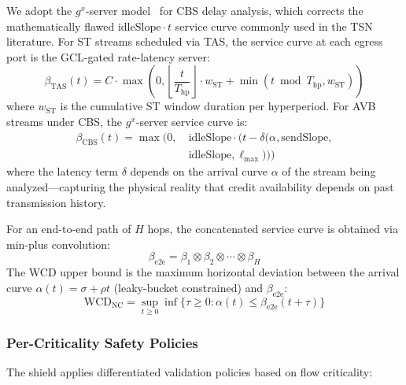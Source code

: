 \documentclass[conference]{IEEEtran}
\begin{document}
We adopt the $g^x$-server model~\cite{jiang2024ncrevisit} for CBS delay analysis, which corrects the mathematically flawed $\text{idleSlope}\cdot t$ service curve commonly used in the TSN literature. For ST streams scheduled via TAS, the service curve at each egress port is the GCL-gated rate-latency server:
\begin{equation}
\beta_{\text{TAS}}(t) = C \cdot \max\left(0, \left\lfloor\frac{t}{T_{\text{hp}}}\right\rfloor \cdot w_{\text{ST}} + \min(t \bmod T_{\text{hp}}, w_{\text{ST}})\right)
\end{equation}
where $w_{\text{ST}}$ is the cumulative ST window duration per hyperperiod. For AVB streams under CBS, the $g^x$-server service curve is:
\begin{equation}
\begin{split}
\beta_{\text{CBS}}(t) = \max\Big(0,\ & \text{idleSlope} \cdot (t - \delta(\alpha, \text{sendSlope},\\
& \text{idleSlope}, \ell_{\max}))\Big)
\end{split}
\end{equation}
where the latency term $\delta$ depends on the arrival curve $\alpha$ of the stream being analyzed---capturing the physical reality that credit availability depends on past transmission history.

For an end-to-end path of $H$ hops, the concatenated service curve is obtained via min-plus convolution:
\begin{equation}
\beta_{\text{e2e}} = \beta_1 \otimes \beta_2 \otimes \cdots \otimes \beta_H
\end{equation}
The WCD upper bound is the maximum horizontal deviation between the arrival curve $\alpha(t) = \sigma + \rho t$ (leaky-bucket constrained) and $\beta_{\text{e2e}}$:
\begin{equation}
\text{WCD}_{\text{NC}} = \sup_{t \geq 0} \inf\{\tau \geq 0 : \alpha(t) \leq \beta_{\text{e2e}}(t + \tau)\}
\end{equation}

\subsubsection{Per-Criticality Safety Policies}

The shield applies differentiated validation policies based on flow criticality:
\end{document}
